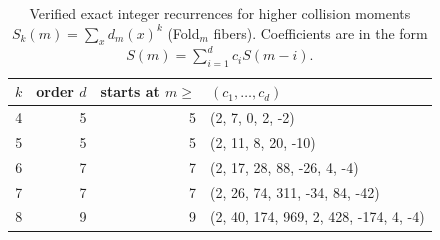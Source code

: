 \begin{table}[H]
\centering
\scriptsize
\setlength{\tabcolsep}{6pt}
\caption{Verified exact integer recurrences for higher collision moments $S_k(m)=\sum_x d_m(x)^k$ (Fold$_m$ fibers). Coefficients are in the form $S(m)=\sum_{i=1}^d c_i S(m-i)$.}
\label{tab:fold_collision_moment_recursions}
\begin{tabular}{r r r l}
\toprule
$k$ & order $d$ & starts at $m\ge$ & $(c_1,\dots,c_d)$\\
\midrule
4 & 5 & 5 & (2, 7, 0, 2, -2)\\
5 & 5 & 5 & (2, 11, 8, 20, -10)\\
6 & 7 & 7 & (2, 17, 28, 88, -26, 4, -4)\\
7 & 7 & 7 & (2, 26, 74, 311, -34, 84, -42)\\
8 & 9 & 9 & (2, 40, 174, 969, 2, 428, -174, 4, -4)\\
\bottomrule
\end{tabular}
\end{table}
